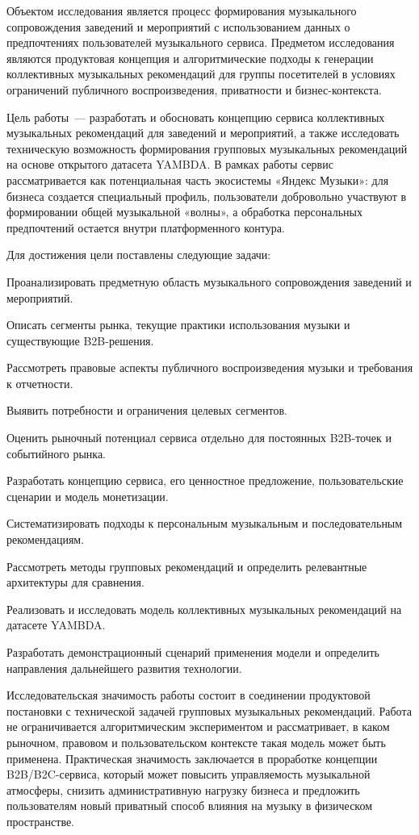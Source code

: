 Объектом исследования является процесс формирования музыкального сопровождения заведений и мероприятий с использованием данных о предпочтениях пользователей музыкального сервиса. Предметом исследования являются продуктовая концепция и алгоритмические подходы к генерации коллективных музыкальных рекомендаций для группы посетителей в условиях ограничений публичного воспроизведения, приватности и бизнес-контекста.

Цель работы~--- разработать и обосновать концепцию сервиса коллективных музыкальных рекомендаций для заведений и мероприятий, а также исследовать техническую возможность формирования групповых музыкальных рекомендаций на основе открытого датасета YAMBDA. В рамках работы сервис рассматривается как потенциальная часть экосистемы «Яндекс Музыки»: для бизнеса создается специальный профиль, пользователи добровольно участвуют в формировании общей музыкальной «волны», а обработка персональных предпочтений остается внутри платформенного контура.

Для достижения цели поставлены следующие задачи:

Проанализировать предметную область музыкального сопровождения заведений и мероприятий.

Описать сегменты рынка, текущие практики использования музыки и существующие B2B-решения.

Рассмотреть правовые аспекты публичного воспроизведения музыки и требования к отчетности.

Выявить потребности и ограничения целевых сегментов.

Оценить рыночный потенциал сервиса отдельно для постоянных B2B-точек и событийного рынка.

Разработать концепцию сервиса, его ценностное предложение, пользовательские сценарии и модель монетизации.

Систематизировать подходы к персональным музыкальным и последовательным рекомендациям.

Рассмотреть методы групповых рекомендаций и определить релевантные архитектуры для сравнения.

Реализовать и исследовать модель коллективных музыкальных рекомендаций на датасете YAMBDA.

Разработать демонстрационный сценарий применения модели и определить направления дальнейшего развития технологии.

Исследовательская значимость работы состоит в соединении продуктовой постановки с технической задачей групповых музыкальных рекомендаций. Работа не ограничивается алгоритмическим экспериментом и рассматривает, в каком рыночном, правовом и пользовательском контексте такая модель может быть применена. Практическая значимость заключается в проработке концепции B2B/B2C-сервиса, который может повысить управляемость музыкальной атмосферы, снизить административную нагрузку бизнеса и предложить пользователям новый приватный способ влияния на музыку в физическом пространстве.

